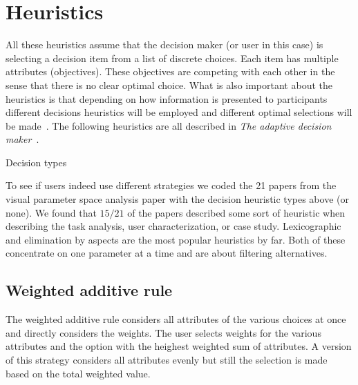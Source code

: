 \section{Heuristics}\label{heuristics}

All these heuristics assume that the decision maker (or user in this case)
is selecting a decision item from a list of discrete choices. Each item
has multiple attributes (objectives). These objectives are competing with
each other in the sense that there is no clear optimal choice. What is also
important about the heuristics is that depending on how information is 
presented to participants different decisions heuristics will be employed
and different optimal selections will be made~\citep{Jarvenpaa:1990}.
The following heuristics are all described in \emph{The adaptive decision
maker}~\citep{Payne:1993}.

\begin{table*}[tb]
  \begin{center}
    \caption{Decision types}
  \end{center}
\end{table*}

To see if users indeed use different strategies we coded the 21 papers from the
visual parameter space analysis paper \citep{Sedlmair:2014} with the decision
heuristic types above (or none). We found that $15/21$ of the papers described
some sort of heuristic when describing the task analysis, user
characterization, or case study.
Lexicographic and elimination by aspects are the most popular heuristics
by far. Both of these concentrate on one parameter at a time and are
about filtering alternatives. 


\subsection{Weighted additive rule}\label{weighted-additive-rule}

The weighted additive rule considers all
attributes of the various choices at once and directly considers 
the weights. The user selects weights for the various attributes and 
the option with the heighest weighted sum of attributes.
A version of this strategy considers all attributes evenly but still
the selection is made based on the total weighted value.

